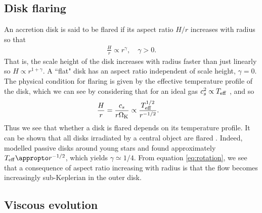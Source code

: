 \subsection{Disk flaring}

An accretion disk is said to be flared if its aspect ratio $H/r$ increases with radius so that
\begin{align}
    \frac{H}{r} \propto r^\gamma, \quad \gamma > 0.
\end{align}
That is, the scale height of the disk increases with radius faster than just linearly so $H \propto r^{1+\gamma}$. 
A ``flat" disk has an aspect ratio independent of scale height, $\gamma=0$.
The physical condition for flaring is given by the effective temperature profile of the disk, which we can see by considering that for an ideal gas $c_s^2 \propto T_{\rm eff}$ \citep[eg.][]{pringle2007}, and so
\begin{align}
    \frac{H}{r} &= \frac{c_s}{r \Omega_{\rm K}} \propto \frac{T_{\rm eff}^{1/2}}{r^{-1/2}}.
\end{align}
Thus we see that whether a disk is flared depends on its temperature profile. 
It can be shown that all disks irradiated by a central object are flared \citep{kenyon1987}. 
Indeed, \citet{chiang1997} modelled passive disks around young stars and found approximately $T_{\rm eff} \appropto r^{-1/2}$, which yields $\gamma \simeq 1/4$. 
From equation \ref{eq:rotation}, we see that a consequence of aspect ratio increasing with radius is that the flow becomes increasingly sub-Keplerian in the outer disk.

\subsection{Viscous evolution}


